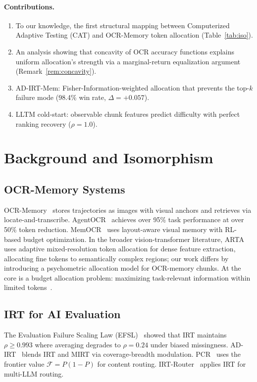 \documentclass{article}
\begin{document}
\paragraph{Contributions.}
\begin{enumerate}
\item To our knowledge, the first structural mapping between Computerized Adaptive Testing (CAT) and OCR-Memory token allocation (Table~\ref{tab:iso}).
\item An analysis showing that concavity of OCR accuracy functions explains uniform allocation's strength via a marginal-return equalization argument (Remark~\ref{rem:concavity}).
\item AD-IRT-Mem: Fisher-Information-weighted allocation that prevents the top-$k$ failure mode (98.4\% win rate, $\Delta = +0.057$).
\item LLTM cold-start: observable chunk features predict difficulty with perfect ranking recovery ($\rho = 1.0$).
\end{enumerate}

\section{Background and Isomorphism}

\subsection{OCR-Memory Systems}

OCR-Memory~\citep{li2026ocr} stores trajectories as images with visual anchors and retrieves via locate-and-transcribe. AgentOCR~\citep{feng2026agentocr} achieves over 95\% task performance at over 50\% token reduction. MemOCR~\citep{shi2026memocr} uses layout-aware visual memory with RL-based budget optimization. In the broader vision-transformer literature, ARTA~\citep{hagerman2026arta} uses adaptive mixed-resolution token allocation for dense feature extraction, allocating fine tokens to semantically complex regions; our work differs by introducing a psychometric allocation model for OCR-memory chunks. At the core is a budget allocation problem: maximizing task-relevant information within limited tokens~\citep{shi2026memocr}.

\subsection{IRT for AI Evaluation}

The Evaluation Failure Scaling Law (EFSL)~\citep{kang2026efsl} showed that IRT maintains $\rho \geq 0.993$ where averaging degrades to $\rho = 0.24$ under biased missingness. AD-IRT~\citep{kang2026adirt} blends IRT and MIRT via coverage-breadth modulation. PCR~\citep{kang2026pcr} uses the frontier value $\mathcal{F} = P(1-P)$ for content routing. IRT-Router~\citep{song2025irt} applies IRT for multi-LLM routing.
\end{document}
